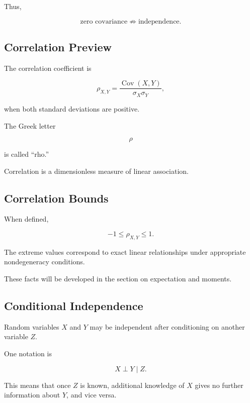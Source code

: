 Thus,

\[
\boxed{
\text{zero covariance}
\not\Longrightarrow
\text{independence}.
}
\]

\subsection{Correlation Preview}
\label{subsec:correlation-preview}

The correlation coefficient is

\[
\boxed{
\rho_{X,Y}
=
\frac{
\operatorname{Cov}(X,Y)
}{
\sigma_X\sigma_Y
},
}
\]

when both standard deviations are positive.

The Greek letter

\[
\rho
\]

is called ``rho.''

Correlation is a dimensionless measure of linear association.

\subsection{Correlation Bounds}
\label{subsec:correlation-bounds}

When defined,

\[
\boxed{
-1
\leq
\rho_{X,Y}
\leq
1.
}
\]

The extreme values correspond to exact linear relationships under
appropriate nondegeneracy conditions.

These facts will be developed in the section on expectation and moments.

\subsection{Conditional Independence}
\label{subsec:conditional-independence}

Random variables \(X\) and \(Y\) may be independent after conditioning
on another variable \(Z\).

One notation is

\[
\boxed{
X\perp Y\mid Z.
}
\]

This means that once \(Z\) is known, additional knowledge of \(X\) gives
no further information about \(Y\), and vice versa.


